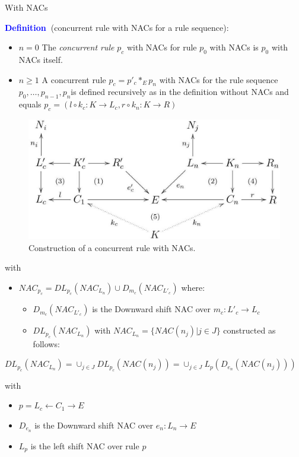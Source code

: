 \documentclass[xcolor=dvipsnames,pdf,10pt]{beamer}
\newcommand{\defn}{\textcolor{blue}{\textbf{\textrm{Definition\ }}}}
\newcommand{\rulesequence}{$p_0,\ldots,p_{n-1},p_n$}
\begin{document}
\begin{frame}[allowframebreaks]{With NACs}

\defn (concurrent rule with NACs for a rule sequence):

\begin{itemize}
\item $n = 0$ The \emph{concurrent rule} $p_c$ with NACs for rule $p_0$ with NACs is $p_0$ with NACs itself.
\item $n \geqslant 1$ A concurrent rule $p_c = p'_c \ast_E p_n $ with NACs for the rule sequence \rulesequence is defined recursively as in the definition without NACs and equals $p_c = (l \circ k_c : K \rightarrow L_c, r \circ k_n : K \rightarrow R)$ 
\end{itemize}

\begin{figure}[htbp]
\centering
\includegraphics[width=.8\textwidth]{concurrent-rule-with-nac.jpg}
\caption{\label{fig:concurrent-rule-with-nac}Construction of a concurrent rule with NACs.}
\end{figure}

with

\begin{itemize}
\item $NAC_{p_c} = DL_{p_c}(NAC_{L_n}) \cup D_{m_c} (NAC_{L'_c})$ where:
\begin{itemize}
\item $D_{m_c}(NAC_{L'_c})$ is the Downward shift NAC over $m_c : L'_c \rightarrow L_c$
\item $DL_{p_c}(NAC_{L_n})$ with $NAC_{L_n} = \{ NAC(n_j)|j \in J\}$ constructed as follows:
\end{itemize}
\end{itemize}

\begin{center}
$DL_{p_c}(NAC_{L_n}) = \cup_{j \in J}DL_{p_c}(NAC(n_j)) = \cup_{j\in J}L_p(D_{e_n}(NAC(n_j)))$
\end{center}

with 
\begin{itemize}
\item $p = L_c \leftarrow C_1 \rightarrow E$ 
\item $D_{e_n}$ is the Downward shift NAC over $e_n : L_n \rightarrow E$
\item $L_p$ is the left shift NAC over rule $p$
\end{itemize}


\end{frame}
\end{document}
